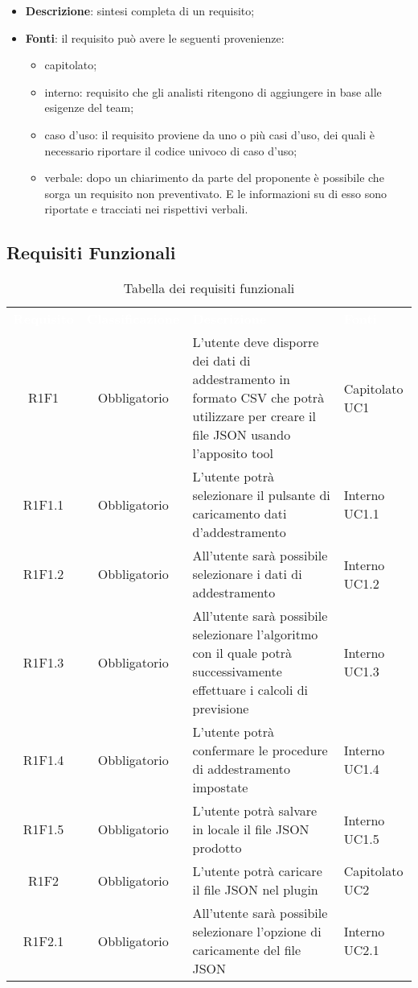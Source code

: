 {\begin{itemize}
					\item \textbf{Descrizione}: sintesi completa di un requisito;
					\item \textbf{Fonti}: il requisito può avere le seguenti provenienze:
					\begin{itemize}
						\item capitolato;
						\item interno: requisito che gli analisti ritengono di aggiungere in base alle esigenze del team;
						\item caso d'uso: il requisito proviene da uno o più casi d'uso, dei quali è necessario riportare il codice univoco di caso d'uso;
						\item verbale: dopo un chiarimento da parte del proponente è possibile che sorga un requisito non preventivato. E le informazioni su di esso sono riportate e tracciati nei rispettivi verbali.
					\end{itemize}
				\end{itemize} 	}


	\subsection{Requisiti Funzionali}

\begin{table}[H]
\centering\renewcommand{\arraystretch}{1.5}
\caption{Tabella dei requisiti funzionali}
\vspace{0.2cm}
\begin{tabular}{ c  c  p{4 cm} C{2.5 cm} }
\textcolor{white}{\textbf{Requisito}} & \textcolor{white}{\textbf{Classificazione}} & 
\textcolor{white}{\textbf{Descrizione}} & \textcolor{white}{\textbf{Fonti}} \\
R1F1 & Obbligatorio & L’utente deve disporre dei dati di addestramento in formato CSV che potrà utilizzare  per creare il file JSON usando l’apposito tool & Capitolato UC1\\
R1F1.1 & Obbligatorio & L’utente potrà selezionare il pulsante di caricamento dati d'addestramento &  Interno UC1.1\\
R1F1.2 & Obbligatorio & All’utente sarà possibile selezionare i dati di addestramento &  Interno UC1.2\\
R1F1.3 & Obbligatorio & All’utente sarà possibile selezionare l’algoritmo con il quale potrà successivamente effettuare i calcoli di previsione &  Interno UC1.3\\
R1F1.4 & Obbligatorio & L’utente potrà confermare le procedure di addestramento impostate &  Interno UC1.4\\
R1F1.5 & Obbligatorio & L’utente potrà salvare in locale il file JSON prodotto & Interno UC1.5\\
R1F2 & Obbligatorio & L’utente potrà caricare il file JSON nel plugin & Capitolato UC2\\
R1F2.1 & Obbligatorio & All’utente sarà possibile selezionare l’opzione di caricamente del file JSON &  Interno UC2.1\\
\end{tabular}
\end{table}

